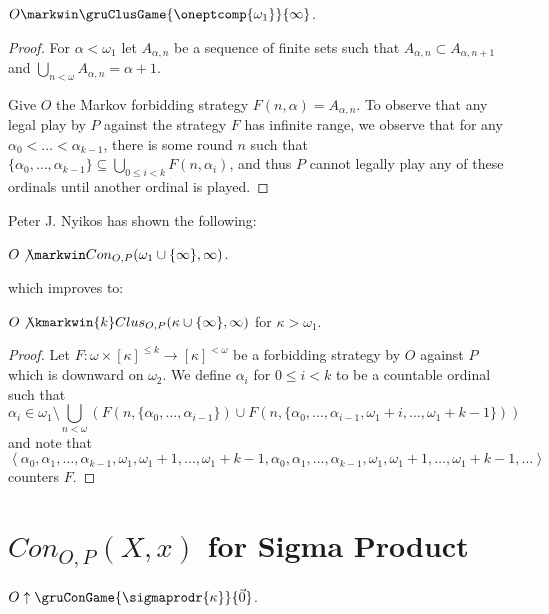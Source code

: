 \begin{thm}
$O\markwin \gruClusGame{\oneptcomp{\omega_1}}{\infty}$.
\end{thm}

\begin{proof}
For $\alpha<\omega_1$ let $A_{\alpha,n}$ be a sequence of finite sets such that $A_{\alpha,n}\subset A_{\alpha,n+1}$ and $\bigcup_{n<\omega}A_{\alpha,n}=\alpha+1$.

Give $O$ the Markov forbidding strategy $F(n,\alpha)=A_{\alpha,n}$. To observe that any legal play by $P$ against the strategy $F$ has infinite range, we observe that for any $\alpha_0<\dots<\alpha_{k-1}$, there is some round $n$ such that $\{\alpha_0,\dots,\alpha_{k-1}\}\subseteq \bigcup_{0\leq i < k}F(n,\alpha_i)$, and thus $P$ cannot legally play any of these ordinals until another ordinal is played.
\end{proof}

Peter J. Nyikos has shown the following:

\begin{thm}
$O\not\markwin Con_{O,P}(\omega_1\cup\{\infty\},\infty)$.
\end{thm}

which improves to:

\begin{thm}
$O\not\kmarkwin{k}Clus_{O,P}(\kappa\cup\{\infty\},\infty)$ for $\kappa>\omega_1$.
\end{thm}

\begin{proof}
Let $F:\omega \times [\kappa]^{\leq k} \to [\kappa]^{<\omega}$ be a forbidding strategy by $O$ against $P$ which is downward on $\omega_2$. We define $\alpha_i$ for $0\leq i < k$ to be a countable ordinal such that \[ \alpha_i \in \omega_1 \setminus\bigcup_{n<\omega}\left(F(n,\{\alpha_0,\dots,\alpha_{i-1}\}) \cup F(n,\{\alpha_0,\dots,\alpha_{i-1},\omega_1+i,\dots,\omega_1+k-1\})\right)\] and note that \[\left<\alpha_0,\alpha_1,\dots,\alpha_{k-1},\omega_1,\omega_1+1,\dots,\omega_1+k-1,\alpha_0,\alpha_1,\dots,\alpha_{k-1},\omega_1,\omega_1+1,\dots,\omega_1+k-1,\dots\right>\] counters $F$.
\end{proof}

\section{$Con_{O,P}(X,x)$ for Sigma Product}

\begin{prop}
$O\uparrow\gruConGame{\sigmaprodr{\kappa}}{\vec{0}}$.
\end{prop}

